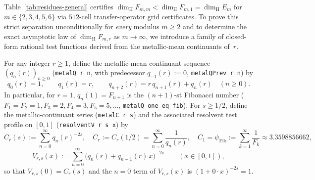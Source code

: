\documentclass[11pt]{article}
\theoremstyle{definition}
\theoremstyle{remark}
\newcommand{\dimH}{\dim_{\mathrm{H}}}
\begin{document}
Table~\ref{tab:residues-general} certifies $\dimH F_{m,m}<\dimH F_{m,1}=\dimH E_m$
for $m\in\{2,3,4,5,6\}$ via $512$-cell transfer-operator grid certificates. To
prove this strict separation unconditionally for \emph{every} modulus $m\ge2$ and
to determine the exact asymptotic law of $\dimH F_{m,r}$ as $m\to\infty$, we
introduce a family of closed-form rational test functions derived from the
metallic-mean continuants of~$r$.

For any integer $r\ge1$, define the metallic-mean continuant sequence
$(q_n(r))_{n\ge0}$ (\texttt{metalQ r n}, with predecessor $q_{-1}(r):=0$,
\texttt{metalQPrev r n}) by
\begin{equation}\label{eq:metallic-continuant}
q_0(r)=1,\qquad q_1(r)=r,\qquad q_{n+2}(r)=r\,q_{n+1}(r)+q_n(r)\quad(n\ge0).
\end{equation}
In particular, for $r=1$, $q_n(1)=F_{n+1}$ is the $(n+1)$-st Fibonacci number
($F_1=F_2=1,F_3=2,F_4=3,F_5=5,\dots$, \texttt{metalQ\_\allowbreak one\_\allowbreak eq\_\allowbreak fib}).
For $s\ge1/2$, define the metallic-continuant series (\texttt{metalC r s}) and
the associated resolvent test profile on $[0,1]$ (\texttt{resolventV r s x}) by
\begin{equation}\label{eq:Cr-Dr}
C_r(s):=\sum_{n=0}^\infty q_n(r)^{-2s},\quad
C_r:=C_r(1/2)=\sum_{n=0}^\infty\frac{1}{q_n(r)},\quad
C_1=\psi_{\mathrm{Fib}}:=\sum_{k=1}^\infty\frac{1}{F_k}\approx 3.3598856662,
\end{equation}
\[
V_{r,s}(x):=\sum_{n=0}^\infty\bigl(q_n(r)+q_{n-1}(r)\,x\bigr)^{-2s}\qquad(x\in[0,1]),
\]
so that $V_{r,s}(0)=C_r(s)$ and the $n=0$ term of $V_{r,s}(x)$ is $(1+0\cdot x)^{-2s}=1$.
\end{document}

